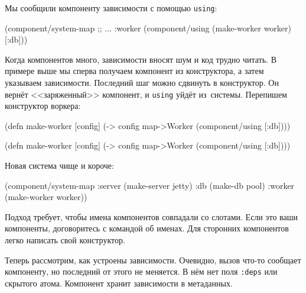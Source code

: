 
Мы сообщили компоненту зависимости с помощью \verb|using|:

\begin{english}
  \begin{clojure}
(component/system-map
 ;; ...
 :worker (component/using
          (make-worker worker) [:db]))
  \end{clojure}
\end{english}

Когда компонентов много, зависимости вносят шум и код трудно читать. В примере
выше мы сперва получаем компонент из конструктора, а затем указываем
зависимости. Последний шаг можно сдвинуть в конструктор. Он вернёт
<<заряженный>> компонент, и \verb|using| уйдёт из~системы. Перепишем конструктор
воркера:

\ifnarrow

\begin{english}
  \begin{clojure}
(defn make-worker [config]
  (-> config
      map->Worker
      (component/using [:db])))
  \end{clojure}
\end{english}

\else

\begin{english}
  \begin{clojure}
(defn make-worker [config]
  (-> config
      map->Worker
      (component/using [:db])))
  \end{clojure}
\end{english}

\fi

\pagebreaklarge

\noindent
Новая система чище и короче:

\begin{english}
  \begin{clojure}
(component/system-map
 :server (make-server jetty)
 :db     (make-db pool)
 :worker (make-worker worker))
  \end{clojure}
\end{english}

Подход требует, чтобы имена компонентов совпадали со слотами. Если это ваши
компоненты, договоритесь с командой об именах. Для сторонних компонентов легко
написать свой конструктор.


Теперь рассмотрим, как устроены зависимости. Очевидно, вызов
 что-то сообщает компоненту, но последний от этого не
меняется. В нём нет поля \verb|:deps| или скрытого атома. Компонент хранит
зависимости в метаданных.

